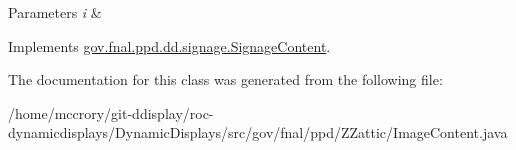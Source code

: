 \begin{DoxyParams}{Parameters}
{\em i} & \\
\hline
\end{DoxyParams}


Implements \hyperlink{interfacegov_1_1fnal_1_1ppd_1_1dd_1_1signage_1_1SignageContent_a59c75e24dcec3ea729297104328a7852}{gov.\-fnal.\-ppd.\-dd.\-signage.\-Signage\-Content}.



The documentation for this class was generated from the following file\-:\begin{DoxyCompactItemize}
\item 
/home/mccrory/git-\/ddisplay/roc-\/dynamicdisplays/\-Dynamic\-Displays/src/gov/fnal/ppd/\-Z\-Zattic/Image\-Content.\-java\end{DoxyCompactItemize}
